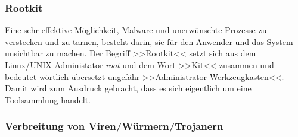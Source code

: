\subsubsection{Rootkit}
\label{sec:Rootkit}

Eine sehr effektive Möglichkeit, Malware und unerwünschte Prozesse zu verstecken und zu tarnen, besteht darin, sie für den Anwender und das System unsichtbar zu machen. Der Begriff >>Rootkit<< setzt sich aus dem Linux/UNIX-Administator \textit{root} und dem Wort >>Kit<< zusammen und bedeutet wörtlich übersetzt ungefähr >>Administrator-Werkzeugkasten<<. Damit wird zum Ausdruck gebracht, dass es sich eigentlich um eine Toolsammlung handelt.

\subsubsection{Verbreitung von Viren/Würmern/Trojanern}
\label{sec:VerbreitungVirenWuermerTrojaner}

